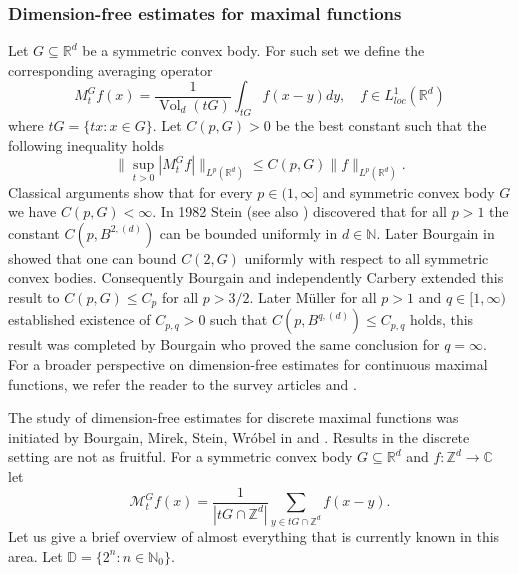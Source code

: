 \documentclass[10pt,a4paper]{amsart}
\numberwithin{equation}{section}
\newcommand{\Z}{\mathbb{Z}}
\newcommand{\R}{\mathbb{R}}
\newcommand{\C}{\mathbb{C}}
\newcommand{\N}{\mathbb{N}}
\DeclareMathOperator{\Vol}{Vol}
\begin{document}
\subsubsection{Dimension-free estimates for maximal functions}
Let $G \subseteq \R^d$ be a symmetric convex body. For such set we define the corresponding averaging operator
\begin{equation} \label{cont avr op defn}
   M_t^Gf(x)= \frac{1}{\Vol_d(tG)} \int_{tG} f(x-y)dy, \quad f \in L^1_{loc}(\R^d) 
\end{equation}
where $tG=\{tx: x \in G\}$. Let $C(p,G)>0$ be the best constant such that the following inequality holds 
\[
\Big\| \sup_{t>0} |M_t^Gf| \Big\|_{L^p(\R^d)} \le C(p,G) \|f \|_{L^p(\R^d)}.
\]
Classical arguments show that for every $p \in (1,\infty]$ and symmetric convex body $G$ we have $C(p,G)<\infty$. In 1982 Stein \cite{SteinMax} (see also \cite{StStr}) discovered that for all $p>1$ the constant $C(p,B^{2,(d)})$ can be bounded uniformly in $d \in \N$. Later Bourgain in \cite{B1} showed that one can bound $C(2,G)$ uniformly with respect to all symmetric convex bodies. Consequently Bourgain \cite{B2} and independently Carbery \cite{Car1} extended this result to $C(p,G) \le C_p$ for all $p>3/2$. Later Müller \cite{Mul1} for all $p>1$ and $q \in [1, \infty)$ established existence of $C_{p,q}>0$ such that $C(p,B^{q,(d)}) \le C_{p,q}$ holds, this result was completed by Bourgain \cite{B3} who proved the same conclusion for $q=\infty$.
For a broader perspective on dimension-free estimates for
continuous maximal functions, we refer the reader to the survey articles \cite{BMSW4} and \cite{HL-cont}.
\par The study of dimension-free estimates for discrete maximal functions was initiated by Bourgain, Mirek, Stein, Wróbel in \cite{cubes} and \cite{balls}.
Results in the discrete setting are not as fruitful.
For a symmetric convex body $G \subseteq \R^d$ and $f: \Z^d \to \C$ let 
\[
\mathcal{M}_t^G f(x)= \frac{1}{|tG \cap \Z^d|} \sum_{y \in tG \cap \Z^d} f(x-y).
\]
Let us give a brief overview of almost everything that is currently known in this area. Let $\mathbb{D}= \{2^n:n \in \N_0\}$.
\end{document}
